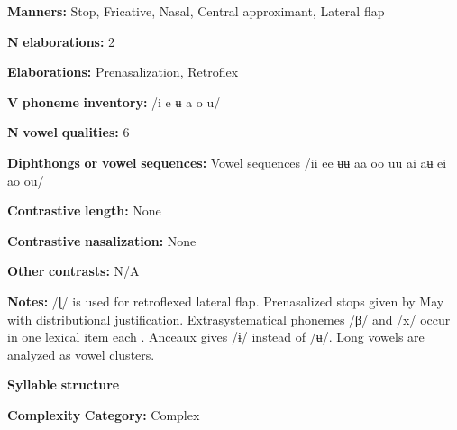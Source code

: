\documentclass[output=paper]{langsci/langscibook}
\begin{document}
\begin{styleBody}
\textbf{Manners:} Stop, Fricative, Nasal, Central approximant, Lateral flap
\end{styleBody}

\begin{styleBody}
\textbf{N} \textbf{elaborations:} 2
\end{styleBody}

\begin{styleBody}
\textbf{Elaborations:} Prenasalization, Retroflex
\end{styleBody}

\begin{styleBody}
\textbf{V} \textbf{phoneme} \textbf{inventory:} /i e ʉ a o u/
\end{styleBody}

\begin{styleBody}
\textbf{N} \textbf{vowel} \textbf{qualities:} 6
\end{styleBody}

\begin{styleBody}
\textbf{Diphthongs} \textbf{or} \textbf{vowel} \textbf{sequences:} Vowel sequences /ii ee ʉʉ aa oo uu ai aʉ ei ao ou/
\end{styleBody}

\begin{styleBody}
\textbf{Contrastive} \textbf{length:} None
\end{styleBody}

\begin{styleBody}
\textbf{Contrastive} \textbf{nasalization:} None
\end{styleBody}

\begin{styleBody}
\textbf{Other} \textbf{contrasts:} N/A
\end{styleBody}

\begin{styleBody}
\textbf{Notes:} /ɭ/ is used for retroflexed lateral flap. Prenasalized stops given by May with distributional justification. Extrasystematical phonemes /β/ and /x/ occur in one lexical item each \citep[9]{Anceaux1965}. Anceaux gives /ɨ/ instead of /ʉ/. Long vowels are analyzed as vowel clusters.
\end{styleBody}

\begin{styleBody}
\textbf{Syllable} \textbf{structure}
\end{styleBody}

\begin{styleBody}
\textbf{Complexity} \textbf{Category:} Complex
\end{styleBody}
\end{document}
